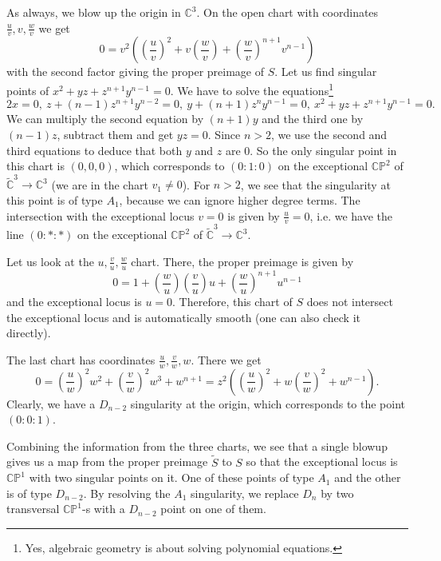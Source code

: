 \documentclass[11pt]{article}
\numberwithin{equation}{section}
\numberwithin{footnote}{section}
\renewcommand{\P}{{\mathbb P}}
\newcommand{\C}{{\mathbb C}}
\begin{document}
\smallskip
As always, we blow up the origin in $\C^3$. On the open chart with coordinates $\frac uv ,v ,\frac wv$ we get
$$
0=v^2 \left(
\left( \frac uv \right)^2 + v \left(\frac wv\right) + \left(\frac wv\right)^{n+1} v^{n-1}
\right)
$$
with the second factor giving the proper preimage of $S$.
Let us find singular points of $x^2 + yz + z^{n+1}y^{n-1}=0$. We have to solve the equations\footnote{ Yes, algebraic geometry is about solving polynomial equations.}
$$
2x = 0,~ z + (n-1) z^{n+1} y^{n-2} = 0,~y + (n+1) z^{n}y^{n-1}=0,~x^2 + yz + z^{n+1}y^{n-1}=0.
$$
We can multiply the second equation by $(n+1)y$ and the third one by $(n-1)z$, subtract them and get $yz=0$. Since  $n>2$, we use the second and third equations to deduce that both $y$ and $z$ are $0$. So the only singular point in this chart is $(0,0,0)$,
which corresponds to $(0:1:0)$ on the exceptional $\C\P^2$ of $\tilde \C^3\to \C^3$ (we are in the chart $v_1\neq 0$).
For $n>2$, we see that the singularity at this point is of type $A_1$, because we can ignore higher degree terms.
The intersection with the exceptional locus $v=0$ is given by $\frac u v=0$, i.e. we have the line $(0:*:*)$ on the exceptional $\C\P^2$ of $\tilde \C^3\to \C^3$.

\smallskip
Let us look at the $u,\frac vu, \frac wu$ chart. There, the proper preimage is given by
$$
0=1 + \left(\frac wu\right) \left(\frac vu\right)u +  \left(\frac wu\right)^{n+1} u^{n-1}
$$
and the exceptional locus is $u=0$. Therefore, this chart of $S$ does not intersect the exceptional locus and is automatically smooth (one can also check it directly).

\smallskip
The last chart has coordinates $\frac uw,\frac vw,w$. There we get
$$
0=\left(\frac uw\right)^2 w^2 + \left(\frac vw\right)^2w^3 + w^{n+1} = z^2\left(\left(\frac uw\right)^2 + w\left(\frac vw\right)^2 + w^{n-1}\right).
$$
Clearly, we have a $D_{n-2}$ singularity at the origin, which corresponds to the point $(0:0:1)$.

\smallskip
Combining the information from the three charts, we see that a single blowup gives us a map from the proper preimage $\tilde S$ to $S$ so that the exceptional locus is $\C\P^1$ with two singular points on it. One of these points of type $A_1$ and the other is of type $D_{n-2}$. By resolving the $A_1$ singularity, we replace $D_n$ by two transversal $\C\P^1$-s with a $D_{n-2}$ point on one of them. 

\hskip -15pt
\end{document}
